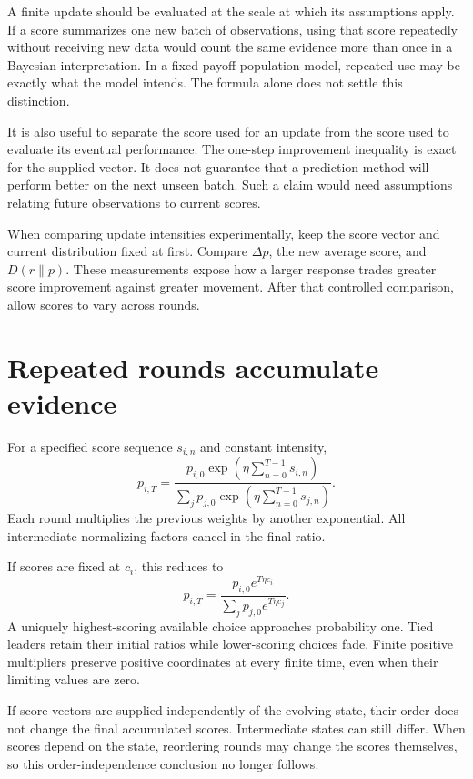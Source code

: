 \documentclass[11pt,oneside,openany]{book}
\theoremstyle{definition}
\theoremstyle{remark}
\numberwithin{equation}{chapter}
\begin{document}
A finite update should be evaluated at the scale at which its assumptions apply. If a score summarizes one new batch of observations, using that score repeatedly without receiving new data would count the same evidence more than once in a Bayesian interpretation. In a fixed-payoff population model, repeated use may be exactly what the model intends. The formula alone does not settle this distinction.

It is also useful to separate the score used for an update from the score used to evaluate its eventual performance. The one-step improvement inequality is exact for the supplied vector. It does not guarantee that a prediction method will perform better on the next unseen batch. Such a claim would need assumptions relating future observations to current scores.

When comparing update intensities experimentally, keep the score vector and current distribution fixed at first. Compare \(\Delta p\), the new average score, and \(D(r\|p)\). These measurements expose how a larger response trades greater score improvement against greater movement. After that controlled comparison, allow scores to vary across rounds.

\section{Repeated rounds accumulate evidence}\label{ch09-repeated-rounds-accumulate-evidence}

For a specified score sequence \(s_{i,n}\) and constant intensity, \[p_{i,T}=
\frac{p_{i,0}\exp\left(\eta\sum_{n=0}^{T-1}s_{i,n}\right)}
{\sum_jp_{j,0}\exp\left(\eta\sum_{n=0}^{T-1}s_{j,n}\right)}.\] Each round multiplies the previous weights by another exponential. All intermediate normalizing factors cancel in the final ratio.

If scores are fixed at \(c_i\), this reduces to \[p_{i,T}=\frac{p_{i,0}e^{T\eta c_i}}
{\sum_jp_{j,0}e^{T\eta c_j}}.\] A uniquely highest-scoring available choice approaches probability one. Tied leaders retain their initial ratios while lower-scoring choices fade. Finite positive multipliers preserve positive coordinates at every finite time, even when their limiting values are zero.

If score vectors are supplied independently of the evolving state, their order does not change the final accumulated scores. Intermediate states can still differ. When scores depend on the state, reordering rounds may change the scores themselves, so this order-independence conclusion no longer follows.
\end{document}
